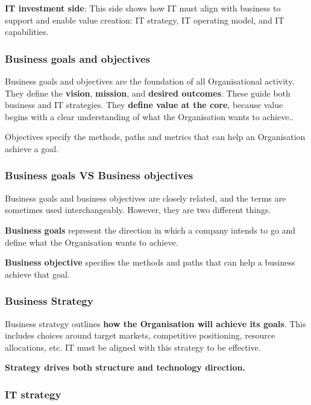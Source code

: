 \textbf{IT investment side}: This side shows how IT must align with business to support and enable value creation: IT strategy, IT operating model, and IT capabilities.

\subsubsection{Business goals and objectives}

\indent

Business goals and objectives are the foundation of all Organisational activity. They define the \textbf{vision}, \textbf{mission}, and \textbf{desired outcomes}. These guide both business and IT strategies. They \textbf{define value at the core}, because value begins with a clear understanding of what the Organisation
wants to achieve..

Objectives specify the methods, paths and metrics that can help an Organisation achieve a goal.

\subsubsection{Business goals VS Business objectives}

\indent

Business goals and business objectives are closely related, and the terms are sometimes used interchangeably. However, they are two different things.

\textbf{Business goals} represent the direction in which a company intends to go and 
define what the Organisation wants to achieve. 

\textbf{Business objective} specifies the methods and paths that can help a 
business achieve that goal.

\subsubsection{Business Strategy}

\indent

Business strategy outlines \textbf{how the Organisation will achieve its goals}. This includes choices around target markets, competitive positioning, resource allocations, etc. IT must be aligned with this strategy to be effective.

\textbf{Strategy drives both structure and technology direction.}

\subsubsection{IT strategy}

